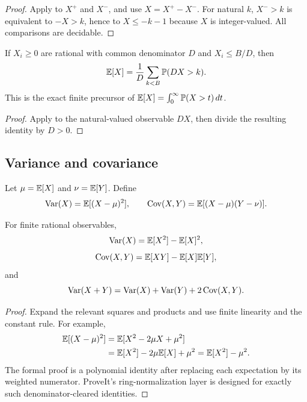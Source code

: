 \begin{proof}
Apply  to \(X^+\) and \(X^-\), and use
\(X=X^+-X^-\).  For natural \(k\),
\(X^->k\) is equivalent to \(-X>k\), hence to \(X\le-k-1\) because \(X\) is
integer-valued.  All comparisons are decidable.
\end{proof}

\begin{theorem}\label{thm:finite-layer-cake}
If \(X_i\ge0\) are rational with common denominator \(D\) and
\(X_i\le B/D\), then
\[
 \mathbb E[X]=\frac1D\sum_{k<B}\mathbb P(DX>k).
\]
This is the exact finite precursor of
\(\mathbb E[X]=\int_0^\infty\mathbb P(X>t)\,dt\).
\end{theorem}

\begin{proof}
Apply  to the natural-valued observable \(DX\), then divide
the resulting identity by \(D>0\).
\end{proof}

\subsection{Variance and covariance}

\begin{definition}\label{def:variance}
Let \(\mu=\mathbb E[X]\) and \(\nu=\mathbb E[Y]\).  Define
\[
 \operatorname{Var}(X)=\mathbb E[(X-\mu)^2],\qquad
 \operatorname{Cov}(X,Y)=\mathbb E[(X-\mu)(Y-\nu)].
\]
\end{definition}

\begin{theorem}\label{thm:variance-identity}
For finite rational observables,
\[
 \operatorname{Var}(X)=\mathbb E[X^2]-\mathbb E[X]^2,
\]
\[
 \operatorname{Cov}(X,Y)=\mathbb E[XY]-\mathbb E[X]\mathbb E[Y],
\]
and
\[
 \operatorname{Var}(X+Y)=\operatorname{Var}(X)+\operatorname{Var}(Y)+2\operatorname{Cov}(X,Y).
\]
\end{theorem}

\begin{proof}
Expand the relevant squares and products and use finite linearity and the
constant rule.  For example,
\begin{align*}
\mathbb E[(X-\mu)^2]
 &=\mathbb E[X^2-2\mu X+\mu^2]\\
 &=\mathbb E[X^2]-2\mu\mathbb E[X]+\mu^2
 =\mathbb E[X^2]-\mu^2.
\end{align*}
The formal proof is a polynomial identity after replacing each expectation by
its weighted numerator.  ProveIt's ring-normalization layer is designed for
exactly such denominator-cleared identities.
\end{proof}

